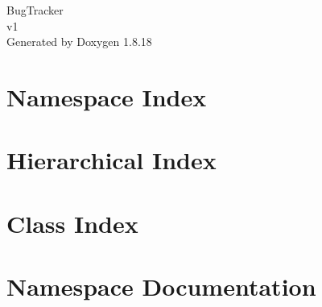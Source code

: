 \let\mypdfximage\pdfximage\def\pdfximage{\immediate\mypdfximage}\documentclass[twoside]{book}
\newcommand{\+}{\discretionary{\mbox{\scriptsize$\hookleftarrow$}}{}{}}
\newcommand{\clearemptydoublepage}{%
  \newpage{\pagestyle{empty}\cleardoublepage}%
}
\begin{document}
\hypersetup{pageanchor=false,
             bookmarksnumbered=true,
             pdfencoding=unicode
            }
\begin{titlepage}
\vspace*{7cm}
\begin{center}%
{\Large Bug\+Tracker \\[1ex]\large v1 }\\
\vspace*{1cm}
{\large Generated by Doxygen 1.8.18}\\
\end{center}
\end{titlepage}
\clearemptydoublepage
{}
\tableofcontents
\clearemptydoublepage
{}
\hypersetup{pageanchor=true}

\chapter{Namespace Index}

\chapter{Hierarchical Index}

\chapter{Class Index}

\chapter{Namespace Documentation}










\end{document}
